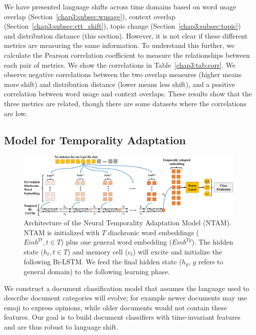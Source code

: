 We have presented language shifts across time domains based on word usage overlap (Section~\ref{chap3:subsec:wusage}), context overlap (Section~\ref{chap3:subsec:ctt_shift}), topic change (Section~\ref{chap3:subsec:topic}) and distribution distance (this section). However, it is not clear if these different metrics are measuring the same information. To understand this further, we calculate the Pearson correlation coefficient to measure the relationships between each pair of metrics. 
We show the correlations in Table~\ref{chap3:tab:corr}. We observe negative correlations between the two overlap measures (higher means more shift) and distribution distance (lower means less shift),
and a positive correlation between word usage and context overlaps.
These results show that the three metrics are related, though there are some datasets where the correlations are low.


\subsection{Model for Temporality Adaptation}
\label{chap3:sec:model}

\begin{figure}[tb!]
\centering
\includegraphics[scale=0.47]{./images/chapter3/model.pdf}
\caption{Architecture of the Neural Temporality Adaptation Model (NTAM). 
NTAM is initialized with $T$ diachronic word embeddings ($Emb^{Tt}, t\in T$) plus one general word embedding ($Emb^{Tg}$). The hidden state ($h_t, t\in T$) and memory cell ($c_t$) will excite and initialize the following Bi-LSTM. We feed the final hidden state ($h_g$, $g$ refers to general domain) to the following learning phase.}
\label{chap3:fig:model}
\end{figure}

We construct a document classification model that assumes
the language used to describe document categories will evolve;
for example
newer documents may use emoji to express opinions,
while older documents would not contain these features.
Our goal is to build document classifiers with time-invariant features and are thus robust to language shift. 

